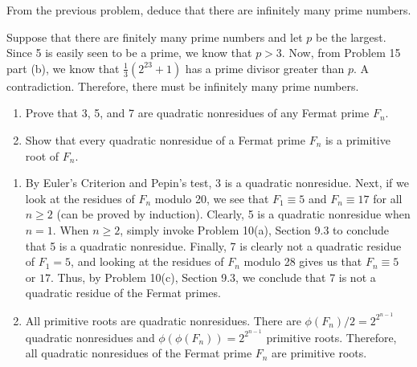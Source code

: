 \begin{exercise}
    From the previous problem, deduce that there are infinitely many prime numbers. \\
\end{exercise}

\begin{solution}
    Suppose that there are finitely many prime numbers and let $p$ be the largest. Since 5 is easily seen to be a prime, we know that $p > 3$. Now, from Problem 15 part (b), we know that $\frac{1}{3}(2^{23} + 1)$ has a prime divisor greater than $p$. A contradiction. Therefore, there must be infinitely many prime numbers. \\
\end{solution}

\begin{exercise}
    \begin{enumerate}
        \item Prove that 3, 5, and 7 are quadratic nonresidues of any Fermat prime $F_n$. 
        \item Show that every quadratic nonresidue of a Fermat prime $F_n$ is a primitive root of $F_n$.\\
    \end{enumerate}
\end{exercise}

\begin{solution}
    \begin{enumerate}
        \item By Euler's Criterion and Pepin's test, 3 is a quadratic nonresidue. Next, if we look at the residues of $F_n$ modulo 20, we see that $F_1 \equiv 5$ and $F_n \equiv 17$ for all $n \geq 2$ (can be proved by induction). Clearly, 5 is a quadratic nonresidue when $n = 1$. When $n \geq 2$, simply invoke Problem 10(a), Section 9.3 to conclude that 5 is a quadratic nonresidue. Finally, 7 is clearly not a quadratic residue of $F_1 = 5$, and looking at the residues of $F_n$ modulo 28 gives us that $F_n \equiv 5$ or $17$. Thus, by Problem 10(c), Section 9.3, we conclude that 7 is not a quadratic residue of the Fermat primes.
        \item All primitive roots are quadratic nonresidues. There are $\phi(F_n)/2 = 2^{2^{n-1}}$ quadratic nonresidues and $\phi(\phi(F_n)) = 2^{2^{n-1}}$ primitive roots. Therefore, all quadratic nonresidues of the Fermat prime $F_n$ are primitive roots. \\
    \end{enumerate}
\end{solution}

